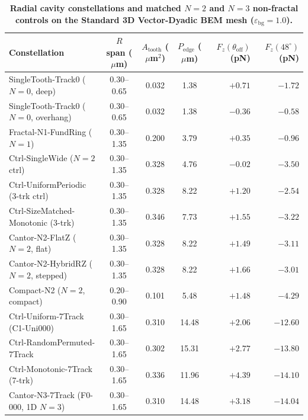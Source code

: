 \documentclass[11pt, a4paper]{article}
\begin{document}
\begin{table}[htbp]
\centering
\small
\caption{\textbf{Radial cavity constellations and matched $N=2$ and $N=3$ non-fractal controls on the Standard 3D Vector-Dyadic BEM mesh ($\varepsilon_{\mathrm{bg}}=1.0$).}}
\label{tab:fractal_geometry_control}
\begin{tabular}{l c c c r r}
\toprule
Constellation & $R$ span ($\mu$m) & $A_{\mathrm{tooth}}$ ($\mu$m$^2$) & $P_{\mathrm{edge}}$ ($\mu$m) & $F_z(\theta_{\mathrm{off}})$ (pN) & $F_z(48^\circ)$ (pN) \\
\midrule
SingleTooth-Track0 ($N=0$, deep) & 0.30--0.65 & 0.032 & 1.38 & $+0.71$ & $-1.72$ \\
SingleTooth-Track0 ($N=0$, overhang) & 0.30--0.65 & 0.032 & 1.38 & $-0.36$ & $-0.58$ \\
Fractal-N1-FundRing ($N=1$) & 0.30--1.35 & 0.200 & 3.79 & $+0.35$ & $-0.96$ \\
Ctrl-SingleWide ($N=2$ ctrl) & 0.30--1.35 & 0.328 & 4.76 & $-0.02$ & $-3.50$ \\
Ctrl-UniformPeriodic (3-trk ctrl) & 0.30--1.35 & 0.328 & 8.22 & $+1.20$ & $-2.54$ \\
Ctrl-SizeMatched-Monotonic (3-trk) & 0.30--1.35 & 0.346 & 7.73 & $+1.55$ & $-3.22$ \\
Cantor-N2-FlatZ ($N=2$, flat) & 0.30--1.35 & 0.328 & 8.22 & $+1.49$ & $-3.11$ \\
Cantor-N2-HybridRZ ($N=2$, stepped) & 0.30--1.35 & 0.328 & 8.22 & $+1.66$ & $-3.01$ \\
Compact-N2 ($N=2$, compact) & 0.20--0.90 & 0.101 & 5.48 & $+1.48$ & $-4.29$ \\
Ctrl-Uniform-7Track (C1-Uni000) & 0.30--1.65 & 0.310 & 14.48 & $+2.06$ & $-12.60$ \\
Ctrl-RandomPermuted-7Track & 0.30--1.65 & 0.302 & 15.31 & $+2.77$ & $-13.80$ \\
Ctrl-Monotonic-7Track (7-trk) & 0.30--1.65 & 0.336 & 11.96 & $+4.39$ & $-14.10$ \\
Cantor-N3-7Track (F0-000, 1D $N=3$) & 0.30--1.65 & 0.310 & 14.48 & $+3.18$ & $-14.04$ \\
\bottomrule
\end{tabular}
\end{table}
\end{document}
